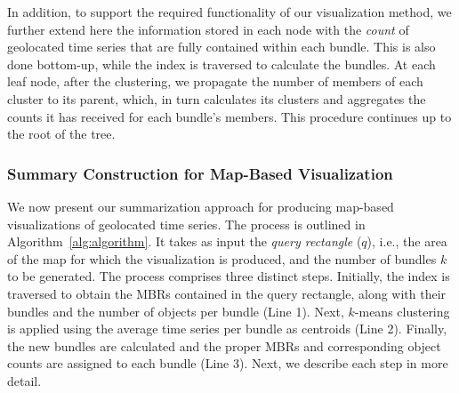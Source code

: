 


In addition, to support the required functionality of our visualization method, we further extend here the information stored in each node with the {\em count} of geolocated time series that are fully contained within each bundle. This is also done bottom-up, while the index is traversed to calculate the bundles. At each leaf node, after the clustering, we propagate the number of members of each cluster to its parent, which, in turn calculates its clusters and aggregates the counts it has received for each bundle's members. This procedure continues up to the root of the tree.


\subsubsection{Summary Construction for Map-Based Visualization}
\label{subsec:visualization}

We now present our summarization approach for producing map-based visualizations of geolocated time series. The process is outlined in Algorithm~\ref{alg:algorithm}. It takes as input the {\em query rectangle} ($q$), i.e., the area of the map for which the visualization is produced, and the number of bundles $k$ to be generated. The process comprises three distinct steps. Initially, the \btsr index is traversed to obtain the MBRs contained in the query rectangle, along with their bundles and the number of objects per bundle (Line 1). Next, $k$-means clustering is applied using the average time series per bundle as centroids (Line 2). Finally, the new bundles are calculated and the proper MBRs and corresponding object counts are assigned to each bundle (Line 3). Next, we describe each step in more detail.


